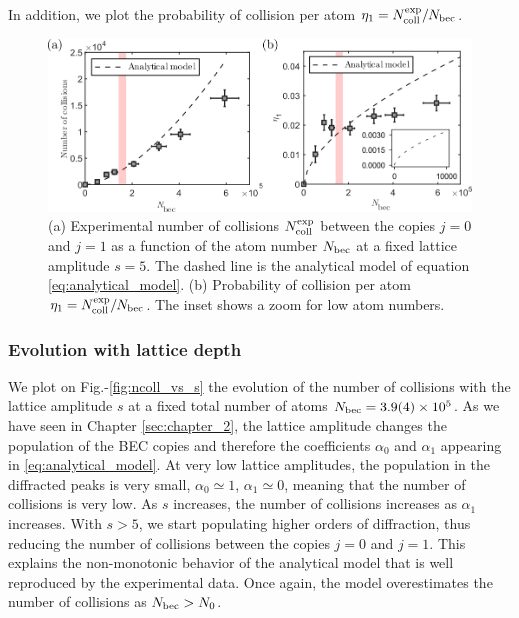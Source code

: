 In addition, we plot the probability of collision per atom $\eta_1=N_{\rm{coll}}^{\rm{exp}}/N_{\rm{bec}}$.

\begin{figure}
    \centering
    \includegraphics[width=\textwidth]{Fig/Chapter3/ncoll_vs_atom_number.png}
    \caption[Experimental number of collisions and probability of collision per atom as a function of the atom number]{(a) Experimental number of collisions $N_{\rm{coll}}^{\rm{exp}}$ between the copies $j=0$ and $j=1$ as a function of the atom number $N_{\rm{bec}}$ at a fixed lattice amplitude $s=5$. The dashed line is the analytical model of equation \ref{eq:analytical_model}. (b) Probability of collision per atom $\eta_1=N_{\rm{coll}}^{\rm{exp}}/N_{\rm{bec}}$. The inset shows a zoom for low atom numbers.}
    \label{fig:ncoll_vs_atom_number}
\end{figure}

\subsubsection{Evolution with lattice depth}

 We plot on Fig.-\ref{fig:ncoll_vs_s} the evolution of the number of collisions with the lattice amplitude $s$ at a fixed total number of atoms $N_{\rm{bec}} = 3.9(4) \times 10^5$. As we have seen in Chapter \ref{sec:chapter_2}, the lattice amplitude changes the population of the BEC copies and therefore the coefficients $\alpha_0$ and $\alpha_1$ appearing in \ref{eq:analytical_model}. At very low lattice amplitudes, the population in the diffracted peaks is very small, $\alpha_0 \simeq 1$, $\alpha_1 \simeq 0$, meaning that the number of collisions is very low. As $s$ increases, the number of collisions increases as $\alpha_1$ increases. With $s > 5$, we start populating higher orders of diffraction, thus reducing the number of collisions between the copies $j=0$ and $j=1$. This explains the non-monotonic behavior of the analytical model that is well reproduced by the experimental data. Once again, the model overestimates the number of collisions as $N_{\rm{bec}} > N_0$.
 
